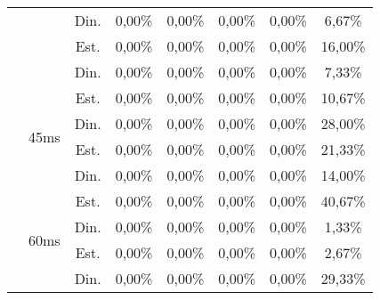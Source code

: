 \begin{center}
\begin{longtable}{|c|c|c|ccccc|}
 &  & Din. & 0,00\% & 0,00\% & 0,00\% & 0,00\% & 6,67\% \\
 &  & Est. & 0,00\% & 0,00\% & 0,00\% & 0,00\% & 16,00\% \\
 &  & Din. & 0,00\% & 0,00\% & 0,00\% & 0,00\% & 7,33\% \\ \cline{2-8} 
 & \multirow{4}{*}{45ms} & Est. & 0,00\% & 0,00\% & 0,00\% & 0,00\% & 10,67\% \\
 &  & Din. & 0,00\% & 0,00\% & 0,00\% & 0,00\% & 28,00\% \\
 &  & Est. & 0,00\% & 0,00\% & 0,00\% & 0,00\% & 21,33\% \\
 &  & Din. & 0,00\% & 0,00\% & 0,00\% & 0,00\% & 14,00\% \\ \cline{2-8} 
 & \multirow{4}{*}{60ms} & Est. & 0,00\% & 0,00\% & 0,00\% & 0,00\% & 40,67\% \\
 &  & Din. & 0,00\% & 0,00\% & 0,00\% & 0,00\% & 1,33\% \\
 &  & Est. & 0,00\% & 0,00\% & 0,00\% & 0,00\% & 2,67\% \\
 &  & Din. & 0,00\% & 0,00\% & 0,00\% & 0,00\% & 29,33\% \\ \hline
\end{longtable}
\end{center}

